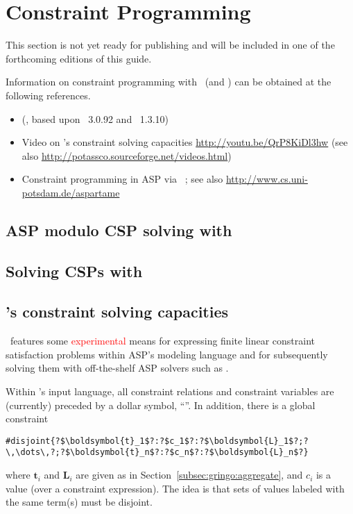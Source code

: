 \section{Constraint Programming}\label{sec:constraint}

This section is not yet ready for publishing
and will be included in one of the forthcoming editions of this guide.

Information on constraint programming with \gringo\ (and \clingcon) can be obtained at the following references.

\begin{itemize}
\item \cite{geossc09a,ostsch12a} (\clingcon, based upon \gringo~3.0.92 and \clasp~1.3.10)
\item Video on \gringo's constraint solving capacities \url{http://youtu.be/QrP8KiDl3hw} (see also \url{http://potassco.sourceforge.net/videos.html})
\item Constraint programming in ASP via \aspartame\ \cite{bageinscsotawe13a}; see also \url{http://www.cs.uni-potsdam.de/aspartame}
\end{itemize}

\subsection{ASP modulo CSP solving with \clingcon}
\label{sec:clingcon}

\subsection{Solving CSPs with \aspartame}
\label{sec:aspartame}

\subsection{\gringo's constraint solving capacities}

\gringo\ features some \textcolor{red}{experimental} means for expressing finite linear constraint satisfaction problems within ASP's modeling language and
for subsequently solving them with off-the-shelf ASP solvers such as \clasp.

Within \gringo's input language,
all constraint relations and constraint variables are (currently) preceded by a dollar symbol, ``\var{\$}''.
In addition, there is a global constraint
\begin{lstlisting}[numbers=none,escapechar=?]
#disjoint{?$\boldsymbol{t}_1$?:?$c_1$?:?$\boldsymbol{L}_1$?;?\,\dots\,?;?$\boldsymbol{t}_n$?:?$c_n$?:?$\boldsymbol{L}_n$?}
\end{lstlisting}
where $\boldsymbol{t}_i$ and $\boldsymbol{L}_i$ are given as in Section~\ref{subsec:gringo:aggregate},
and $c_i$ is a value (over a constraint expression).
%
The idea is that sets of values labeled with the same term(s) must be disjoint.

